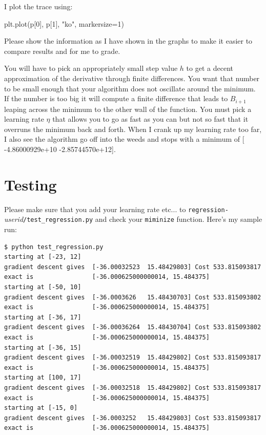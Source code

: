 \documentclass[titlepage]{tufte-book}
\begin{document}
\begin{fullwidth}
\noindent I plot the trace using:

\begin{pyverbatim}
plt.plot(p[0], p[1], "ko", markersize=1)
\end{pyverbatim}

Please show the information as I have shown in the graphs to make it easier to compare results and for me to grade. 

You will have to pick an appropriately small step value $h$ to get a decent approximation of the derivative through finite differences. You want that number to be small enough that your algorithm does not oscillate around the minimum. If the number is too big it will compute a finite difference that leads to $B_{i+1}$ leaping across the minimum to the other wall of the function. You must pick a learning rate $\eta$ that allows you to go as fast as you can but not so fast that it overruns the minimum back and forth. When I crank up my learning rate too far, I also see the algorithm go off into the weeds and stops with a minimum of [ -4.86000929e+10  -2.85744570e+12].

\section{Testing}

Please make sure that you add your learning rate etc... to {\tt regression-}{\em userid}{\tt /test\_regression.py} and check your {\tt miminize} function.  Here's my sample run:

\begin{lstlisting}[style=BashInputStyle]
$ python test_regression.py
starting at [-23, 12]
gradient descent gives  [-36.00032523  15.48429803] Cost 533.815093817
exact is                [-36.000625000000014, 15.484375]
starting at [-50, 10]
gradient descent gives  [-36.0003626   15.48430703] Cost 533.815093802
exact is                [-36.000625000000014, 15.484375]
starting at [-36, 17]
gradient descent gives  [-36.00036264  15.48430704] Cost 533.815093802
exact is                [-36.000625000000014, 15.484375]
starting at [-36, 15]
gradient descent gives  [-36.00032519  15.48429802] Cost 533.815093817
exact is                [-36.000625000000014, 15.484375]
starting at [100, 17]
gradient descent gives  [-36.00032518  15.48429802] Cost 533.815093817
exact is                [-36.000625000000014, 15.484375]
starting at [-15, 0]
gradient descent gives  [-36.0003252   15.48429803] Cost 533.815093817
exact is                [-36.000625000000014, 15.484375]
\end{lstlisting}


\end{fullwidth}
\end{document}
